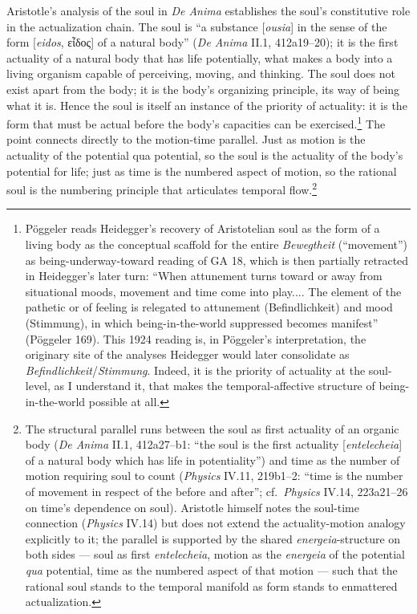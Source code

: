 \documentclass{article}
\newcommand{\gk}[1]{{\greekfont #1}}
\begin{document}
Aristotle's analysis of the soul in \textit{De Anima} establishes the soul's constitutive role in the actualization chain. The soul is ``a substance [\textit{ousia}] in the sense of the form [\textit{eidos}, \gk{εἶδος}] of a natural body'' (\textit{De Anima} II.1, 412a19--20); it is the first actuality of a natural body that has life potentially, what makes a body into a living organism capable of perceiving, moving, and thinking. The soul does not exist apart from the body; it is the body's organizing principle, its way of being what it is. Hence the soul is itself an instance of the priority of actuality: it is the form that must be actual before the body's capacities can be exercised.\footnote{Pöggeler reads Heidegger's recovery of Aristotelian soul as the form of a living body as the conceptual scaffold for the entire \textit{Bewegtheit} (``movement'') as being-underway-toward reading of GA 18, which is then partially retracted in Heidegger's later turn: ``When attunement turns toward or away from situational moods, movement and time come into play.... The element of the pathetic or of feeling is relegated to attunement (Befindlichkeit) and mood (Stimmung), in which being-in-the-world suppressed becomes manifest'' (Pöggeler 169). This 1924 reading is, in Pöggeler's interpretation, the originary site of the analyses Heidegger would later consolidate as \textit{Befindlichkeit}/\textit{Stimmung}. Indeed, it is the priority of actuality at the soul-level, as I understand it, that makes the temporal-affective structure of being-in-the-world possible at all.} The point connects directly to the motion-time parallel. Just as motion is the actuality of the potential qua potential, so the soul is the actuality of the body's potential for life; just as time is the numbered aspect of motion, so the rational soul is the numbering principle that articulates temporal flow.\footnote{The structural parallel runs between the soul as first actuality of an organic body (\textit{De Anima} II.1, 412a27--b1: ``the soul is the first actuality [\textit{entelecheia}] of a natural body which has life in potentiality'') and time as the number of motion requiring soul to count (\textit{Physics} IV.11, 219b1--2: ``time is the number of movement in respect of the before and after''; cf.\ \textit{Physics} IV.14, 223a21--26 on time's dependence on soul). Aristotle himself notes the soul-time connection (\textit{Physics} IV.14) but does not extend the actuality-motion analogy explicitly to it; the parallel is supported by the shared \textit{energeia}-structure on both sides --- soul as first \textit{entelecheia}, motion as the \textit{energeia} of the potential \textit{qua} potential, time as the numbered aspect of that motion --- such that the rational soul stands to the temporal manifold as form stands to enmattered actualization.}
\end{document}
